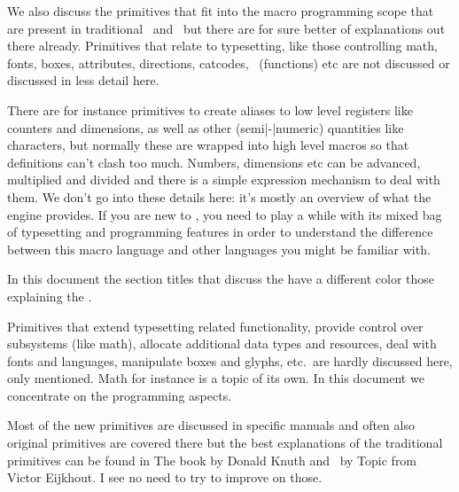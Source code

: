 We also discuss the primitives that fit into the macro programming scope that are
present in traditional \TEX\ and \ETEX\ but there are for sure better of
explanations out there already. Primitives that relate to typesetting, like those
controlling math, fonts, boxes, attributes, directions, catcodes, \LUA\
(functions) etc are not discussed or discussed in less detail here.

There are for instance primitives to create aliases to low level registers like
counters and dimensions, as well as other (semi|-|numeric) quantities like
characters, but normally these are wrapped into high level macros so that
definitions can't clash too much. Numbers, dimensions etc can be advanced,
multiplied and divided and there is a simple expression mechanism to deal with
them. We don't go into these details here: it's mostly an overview of what the
engine provides. If you are new to \TEX, you need to play a while with its mixed
bag of typesetting and programming features in order to understand the difference
between this macro language and other languages you might be familiar with.

\startcolumns
\stopcolumns

In this document the section titles that discuss the \color [nonecolor] {original
\TEX\ and \ETEX\ primitives} have a different color those explaining the \color
[primcolor] {\LUATEX\ and \LUAMETATEX\ primitives}.

Primitives that extend typesetting related functionality, provide control over
subsystems (like math), allocate additional data types and resources, deal with
fonts and languages, manipulate boxes and glyphs, etc.\ are hardly discussed
here, only mentioned. Math for instance is a topic of its own. In this document
we concentrate on the programming aspects.

Most of the new primitives are discussed in specific manuals and often also
original primitives are covered there but the best explanations of the
traditional primitives can be found in The \TEX book by Donald Knuth and \TEX\ by
Topic from Victor Eijkhout. I see no need to try to improve on those.



